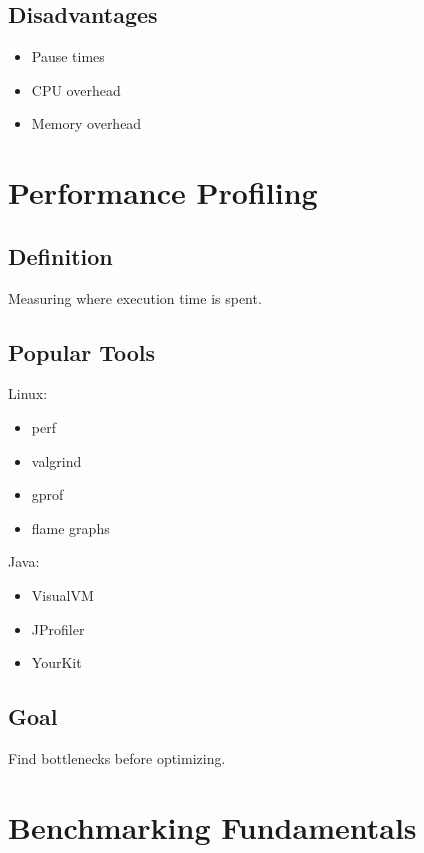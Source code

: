 \subsection{Disadvantages}

\begin{itemize}
\item Pause times
\item CPU overhead
\item Memory overhead
\end{itemize}

\section{Performance Profiling}

\subsection{Definition}

Measuring where execution time is spent.

\subsection{Popular Tools}

Linux:

\begin{itemize}
\item perf
\item valgrind
\item gprof
\item flame graphs
\end{itemize}

Java:

\begin{itemize}
\item VisualVM
\item JProfiler
\item YourKit
\end{itemize}

\subsection{Goal}

Find bottlenecks before optimizing.

\section{Benchmarking Fundamentals}

